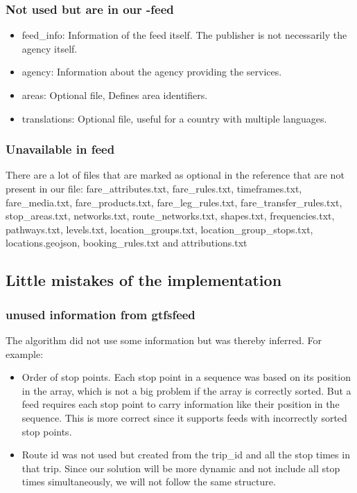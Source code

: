 \subsubsection{Not used but are in our -feed}
\begin{itemize}
    \item feed\_info: Information of the feed itself. The publisher is not necessarily the agency itself.
    \item agency: Information about the agency providing the services.
    \item areas: Optional file, Defines area identifiers.
    \item translations: Optional file, useful for a country with multiple languages.
\end{itemize}
\subsubsection{Unavailable in feed}
There are a lot of files that are marked as optional in the reference \cite{noauthor_gtfs_2022} that are not present in our file:
fare\_attributes.txt,
    fare\_rules.txt,
    timeframes.txt,
    fare\_media.txt,
    fare\_products.txt,
    fare\_leg\_rules.txt,
    fare\_transfer\_rules.txt,
    stop\_areas.txt,
    networks.txt,
    route\_networks.txt,
    shapes.txt,
    frequencies.txt,
    pathways.txt,
    levels.txt,
    location\_groups.txt,
    location\_group\_stops.txt,
    locations.geojson,
    booking\_rules.txt and
    attributions.txt

\subsection{Little mistakes of the implementation}
\subsubsection{unused information from gtfsfeed}
The algorithm did not use some information but was thereby inferred. For example:
\begin{itemize}
    \item Order of stop points. Each stop point in a sequence was based on its position in the array, which is not a big problem if the array is correctly sorted. But a  feed requires each stop point to carry information like their position in the sequence. This is more correct since it supports feeds with incorrectly sorted stop points.
    \item Route id was not used but created from the trip\_id and all the stop times in that trip. Since our solution will be more dynamic and not include all stop times simultaneously, we will not follow the same structure.
\end{itemize}
